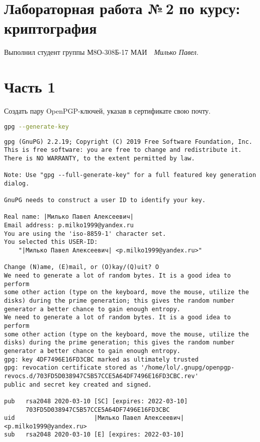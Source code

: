 \documentclass[12pt]{article}
\newcommand{\se}[1]{\section*{\bf #1}}
\begin{document}
\section*{\centering Лабораторная работа №\,2 по курсу:\\ криптография}

Выполнил студент группы М8О-308Б-17 МАИ \,\, \textit{Милько Павел}.

\se{Часть 1}

Создать пару OpenPGP-ключей, указав в сертификате свою почту.

\begin{lstlisting}[language=bash,style=custom]
gpg --generate-key 
\end{lstlisting}

{\scriptsize
\begin{lstlisting}[escapechar=|,breaklines=true]
gpg (GnuPG) 2.2.19; Copyright (C) 2019 Free Software Foundation, Inc.
This is free software: you are free to change and redistribute it.
There is NO WARRANTY, to the extent permitted by law.

Note: Use "gpg --full-generate-key" for a full featured key generation dialog.

GnuPG needs to construct a user ID to identify your key.

Real name: |Милько Павел Алексеевич|
Email address: p.milko1999@yandex.ru
You are using the 'iso-8859-1' character set.
You selected this USER-ID:
    "|Милько Павел Алексеевич| <p.milko1999@yandex.ru>"

Change (N)ame, (E)mail, or (O)kay/(Q)uit? O
We need to generate a lot of random bytes. It is a good idea to perform
some other action (type on the keyboard, move the mouse, utilize the
disks) during the prime generation; this gives the random number
generator a better chance to gain enough entropy.
We need to generate a lot of random bytes. It is a good idea to perform
some other action (type on the keyboard, move the mouse, utilize the
disks) during the prime generation; this gives the random number
generator a better chance to gain enough entropy.
gpg: key 4DF7496E16FD3CBC marked as ultimately trusted
gpg: revocation certificate stored as '/home/lol/.gnupg/openpgp-revocs.d/703FD5D038947C5B57CCE5A64DF7496E16FD3CBC.rev'
public and secret key created and signed.

pub   rsa2048 2020-03-10 [SC] [expires: 2022-03-10]
      703FD5D038947C5B57CCE5A64DF7496E16FD3CBC
uid                      |Милько Павел Алексеевич| <p.milko1999@yandex.ru>
sub   rsa2048 2020-03-10 [E] [expires: 2022-03-10]
\end{lstlisting}
}
\end{document}
